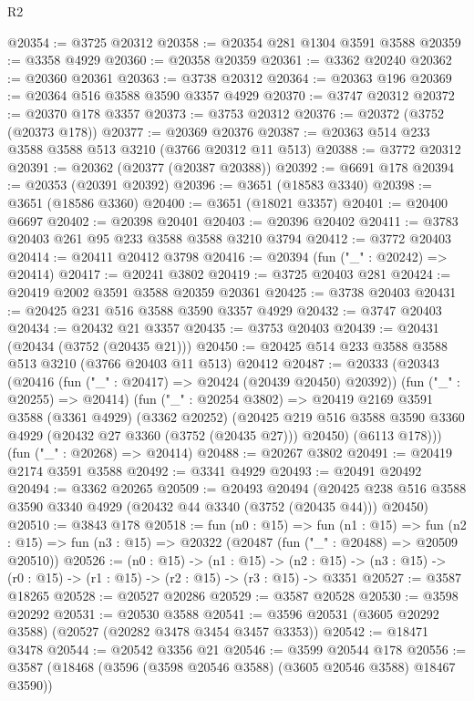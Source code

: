 \begin{lexlean}{R2}
\begin{coremodule}
@20354 := @3725 @20312
@20358 := @20354 @281 @1304 @3591 @3588
@20359 := @3358 @4929
@20360 := @20358 @20359
@20361 := @3362 @20240
@20362 := @20360 @20361
@20363 := @3738 @20312
@20364 := @20363 @196
@20369 := @20364 @516 @3588 @3590 @3357 @4929
@20370 := @3747 @20312
@20372 := @20370 @178 @3357
@20373 := @3753 @20312
@20376 := @20372 (@3752 (@20373 @178))
@20377 := @20369 @20376
@20387 := @20363 @514 @233 @3588 @3588 @513 @3210 (@3766 @20312 @11 @513)
@20388 := @3772 @20312
@20391 := @20362 (@20377 (@20387 @20388))
@20392 := @6691 @178
@20394 := @20353 (@20391 @20392)
@20396 := @3651 (@18583 @3340)
@20398 := @3651 (@18586 @3360)
@20400 := @3651 (@18021 @3357)
@20401 := @20400 @6697
@20402 := @20398 @20401
@20403 := @20396 @20402
@20411 := @3783 @20403 @261 @95 @233 @3588 @3588 @3210 @3794
@20412 := @3772 @20403
@20414 := @20411 @20412 @3798
@20416 := @20394 (fun ("_" : @20242) => @20414)
@20417 := @20241 @3802
@20419 := @3725 @20403 @281
@20424 := @20419 @2002 @3591 @3588 @20359 @20361
@20425 := @3738 @20403
@20431 := @20425 @231 @516 @3588 @3590 @3357 @4929
@20432 := @3747 @20403
@20434 := @20432 @21 @3357
@20435 := @3753 @20403
@20439 := @20431 (@20434 (@3752 (@20435 @21)))
@20450 := @20425 @514 @233 @3588 @3588 @513 @3210 (@3766 @20403 @11 @513) @20412
@20487 := @20333
    (@20343
      (@20416 (fun ("_" : @20417) => @20424 (@20439 @20450) @20392))
      (fun ("_" : @20255) => @20414)
      (fun ("_" : @20254 @3802) =>
      @20419
        @2169
        @3591
        @3588
        (@3361 @4929)
        (@3362 @20252)
        (@20425 @219 @516 @3588 @3590 @3360 @4929 (@20432 @27 @3360 (@3752 (@20435 @27))) @20450)
        (@6113 @178)))
    (fun ("_" : @20268) => @20414)
@20488 := @20267 @3802
@20491 := @20419 @2174 @3591 @3588
@20492 := @3341 @4929
@20493 := @20491 @20492
@20494 := @3362 @20265
@20509 := @20493
    @20494
    (@20425 @238 @516 @3588 @3590 @3340 @4929 (@20432 @44 @3340 (@3752 (@20435 @44))) @20450)
@20510 := @3843 @178
@20518 := fun (n0 : @15) =>
  fun (n1 : @15) =>
  fun (n2 : @15) => fun (n3 : @15) => @20322 (@20487 (fun ("_" : @20488) => @20509 @20510))
@20526 := (n0 : @15) ->
  (n1 : @15) ->
  (n2 : @15) -> (n3 : @15) -> (r0 : @15) -> (r1 : @15) -> (r2 : @15) -> (r3 : @15) -> @3351
@20527 := @3587 @18265
@20528 := @20527 @20286
@20529 := @3587 @20528
@20530 := @3598 @20292
@20531 := @20530 @3588
@20541 := @3596 @20531 (@3605 @20292 @3588) (@20527 (@20282 @3478 @3454 @3457 @3353))
@20542 := @18471 @3478
@20544 := @20542 @3356 @21
@20546 := @3599 @20544 @178
@20556 := @3587 (@18468 (@3596 (@3598 @20546 @3588) (@3605 @20546 @3588) @18467 @3590))

\end{coremodule}
\end{lexlean}
